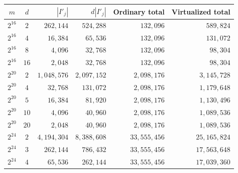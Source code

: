 \begin{table}[!htbp]
\centering
\small\begin{tabular}{c c r r r r}
    \hline
    $m$ & $d$
    & $|I'_j|$
    & $d|I'_j|$
    & Ordinary total
    & Virtualized total \\
    \hline
    
    $2^{16}$ & $2$
    & $262{,}144$
    & $524{,}288$
    & $132{,}096$
    & $589{,}824$ \\
    
    $2^{16}$ & $4$
    & $16{,}384$
    & $65{,}536$
    & $132{,}096$
    & $131{,}072$ \\
    
    $2^{16}$ & $8$
    & $4{,}096$
    & $32{,}768$
    & $132{,}096$
    & $98{,}304$ \\
    
    $2^{16}$ & $16$
    & $2{,}048$
    & $32{,}768$
    & $132{,}096$
    & $98{,}304$ \\
    
    \hline
    
    $2^{20}$ & $2$
    & $1{,}048{,}576$
    & $2{,}097{,}152$
    & $2{,}098{,}176$
    & $3{,}145{,}728$ \\
    
    $2^{20}$ & $4$
    & $32{,}768$
    & $131{,}072$
    & $2{,}098{,}176$
    & $1{,}179{,}648$ \\
    
    $2^{20}$ & $5$
    & $16{,}384$
    & $81{,}920$
    & $2{,}098{,}176$
    & $1{,}130{,}496$ \\
    
    $2^{20}$ & $10$
    & $4{,}096$
    & $40{,}960$
    & $2{,}098{,}176$
    & $1{,}089{,}536$ \\
    
    $2^{20}$ & $20$
    & $2{,}048$
    & $40{,}960$
    & $2{,}098{,}176$
    & $1{,}089{,}536$ \\
    
    \hline
    
    $2^{24}$ & $2$
    & $4{,}194{,}304$
    & $8{,}388{,}608$
    & $33{,}555{,}456$
    & $25{,}165{,}824$ \\
    
    $2^{24}$ & $3$
    & $262{,}144$
    & $786{,}432$
    & $33{,}555{,}456$
    & $17{,}563{,}648$ \\
    
    $2^{24}$ & $4$
    & $65{,}536$
    & $262{,}144$
    & $33{,}555{,}456$
    & $17{,}039{,}360$ \\
    

\end{tabular}
\end{table}
